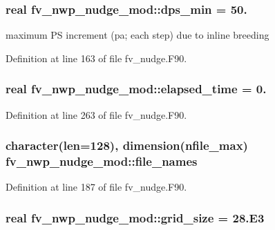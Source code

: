 \subsubsection[{dps\-\_\-min}]{\setlength{\rightskip}{0pt plus 5cm}real fv\-\_\-nwp\-\_\-nudge\-\_\-mod\-::dps\-\_\-min = 50.\hspace{0.3cm}{\ttfamily [private]}}\label{classfv__nwp__nudge__mod_a4af1c4f2d5d76d8cd9766c468a80ef59}


maximum P\-S increment (pa; each step) due to inline breeding 



Definition at line 163 of file fv\-\_\-nudge.\-F90.

\subsubsection[{elapsed\-\_\-time}]{\setlength{\rightskip}{0pt plus 5cm}real fv\-\_\-nwp\-\_\-nudge\-\_\-mod\-::elapsed\-\_\-time = 0.\hspace{0.3cm}{\ttfamily [private]}}\label{classfv__nwp__nudge__mod_a80705a18203ac9f1ade4dfaf5396ed19}


Definition at line 263 of file fv\-\_\-nudge.\-F90.

\subsubsection[{file\-\_\-names}]{\setlength{\rightskip}{0pt plus 5cm}character(len=128), dimension({\bf nfile\-\_\-max}) fv\-\_\-nwp\-\_\-nudge\-\_\-mod\-::file\-\_\-names\hspace{0.3cm}{\ttfamily [private]}}\label{classfv__nwp__nudge__mod_a4a4209d304ae4ac9cd30d3139b1bfb6d}


Definition at line 187 of file fv\-\_\-nudge.\-F90.

\subsubsection[{grid\-\_\-size}]{\setlength{\rightskip}{0pt plus 5cm}real fv\-\_\-nwp\-\_\-nudge\-\_\-mod\-::grid\-\_\-size = 28.E3\hspace{0.3cm}{\ttfamily [private]}}\label{classfv__nwp__nudge__mod_a7cb840172166ac14895fa478c0b600d1}


